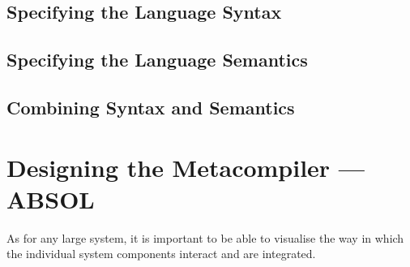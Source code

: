 

\subsection{Specifying the Language Syntax} %
\label{sub:specifying_the_language_syntax}


\subsection{Specifying the Language Semantics} %
\label{sub:specifying_the_language_semantics}


\subsection{Combining Syntax and Semantics} %
\label{sub:combining_syntax_and_semantics}



\section{Designing the Metacompiler --- ABSOL} %
\label{sec:designing_the_metacompiler_absol}

As for any large system, it is important to be able to visualise the way in which the individual system components interact and are integrated. \\

